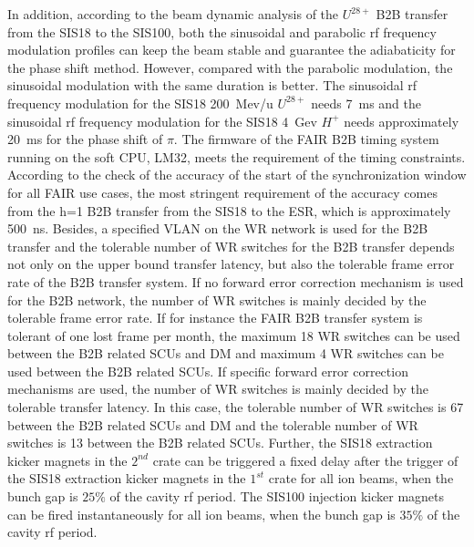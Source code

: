 In addition, according to the beam dynamic analysis of the $U^{28+}$ B2B transfer from the SIS18 to the SIS100, both the sinusoidal and parabolic rf frequency modulation profiles can keep the beam stable and guarantee the adiabaticity for the phase shift method. However, compared with the parabolic modulation, the sinusoidal modulation with the same duration is better. The sinusoidal rf frequency modulation for the SIS18 \SI{200}{Mev/u} $U^{28+}$ needs \SI{7}{\ms} and the sinusoidal rf frequency modulation for the SIS18 \SI{4}{Gev} $H^{+}$ needs approximately \SI{20}{\ms} for the phase shift of $\pi$. The firmware of the FAIR B2B timing system running on the soft CPU, LM32, meets the requirement of the timing constraints. According to the check of the accuracy of the start of the synchronization window for all FAIR use cases, the most stringent requirement of the accuracy comes from the h=1 B2B transfer from the SIS18 to the ESR, which is approximately \SI{500}{\ns}. Besides, a specified VLAN on the WR network is used for the B2B transfer and the tolerable number of WR switches for the B2B transfer depends not only on the upper bound transfer latency, but also the tolerable frame error rate of the B2B transfer system. If no forward error correction mechanism is used for the B2B network, the number of WR switches is mainly decided by the tolerable frame error rate. If for instance the FAIR B2B transfer system is tolerant of one lost frame per month, the maximum 18 WR switches can be used between the B2B related SCUs and DM and maximum 4 WR switches can be used between the B2B related SCUs. If specific forward error correction mechanisms are used, the number of WR switches is mainly decided by the tolerable transfer latency. In this case, the tolerable number of WR switches is 67 between the B2B related SCUs and DM and the tolerable number of WR switches is 13 between the B2B related SCUs. Further, the SIS18 extraction kicker magnets in the $2^{nd}$ crate can be triggered a fixed delay after the trigger of the SIS18 extraction kicker magnets in the $1^{st}$ crate for all ion beams, when the bunch gap is $25\%$ of the cavity rf period. The SIS100 injection kicker magnets can be fired instantaneously for all ion beams, when the bunch gap is $35\%$ of the cavity rf period.


